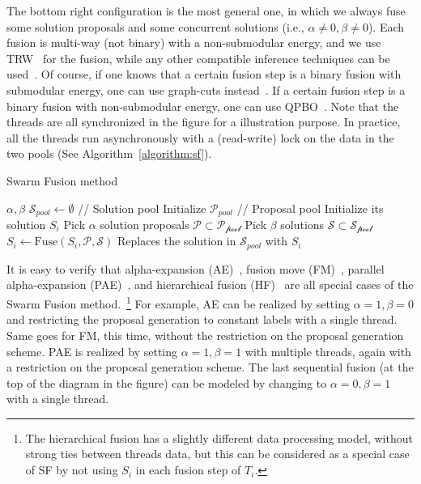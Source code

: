 %
The bottom right configuration is the most general one, in which we
always fuse some solution proposals and some concurrent solutions
(i.e., $\alpha\ne 0, \beta \ne 0$).
%
Each fusion is multi-way (not binary) with a non-submodular energy, and
we use TRW~\cite{kolmogorov} for the fusion, while any other compatible
inference techniques can be used~\cite{opengm}. Of course, if one knows
that a certain fusion step is a binary fusion with submodular energy,
one can use graph-cuts instead~\cite{alpha_expansion_paper}. If a
certain fusion step is a binary fusion with non-submodular energy, one
can use QPBO~\cite{second_order_smoothness_stereo}.
%
Note that the threads are all synchronized in the figure for a
illustration purpose. In practice, all the threads run asynchronously
with a (read-write) lock on the data in the two pools (See Algorithm~\ref{algorithm:sf}).
%
%
%
\begin{algorithm}
 \caption{Swarm Fusion method}
 \label{algorithm:sf}
 \begin{algorithmic}
  \Procedure{} {$\alpha, \beta$}
  \State $\mathcal{S}_{pool} \leftarrow \emptyset$ //
  Solution pool
  \State Initialize $\mathcal{P}_{pool}$ // Proposal pool
  \State Initialize its solution $S_i$
  \EndFor
  \State
  \State Pick $\alpha$ solution proposals $\mathcal{P}\subset \mathcal{P_{\mbox{pool}}}$
  \State Pick $\beta$ solutions $\mathcal{S} \subset \mathcal{S_{\mbox{pool}}}$
  \State $S_i \leftarrow \mbox{Fuse}(S_i, \mathcal{P}, \mathcal{S})$
  \State Replaces the solution in $\mathcal{S}_{pool}$ with $S_i$
  \EndFor
  \EndProcedure
 \end{algorithmic}
\end{algorithm}



\noindent It is easy to verify that alpha-expansion
(AE)~\cite{alpha_expansion}, fusion move (FM)~\cite{viktor}, parallel
alpha-expansion (PAE)~\cite{delong}, and hierarchical fusion
(HF)~\cite{delong_hierarchical,olga} are all special cases of the Swarm
Fusion method.~\footnote{The hierarchical fusion has a slightly
different data processing model, without strong ties between threads
data, but this can be considered as a special case of SF by not using
$S_i$ in each fusion step of $T_i$.} For example, AE can be realized by
setting $\alpha=1, \beta=0$ and restricting the proposal generation to
constant labels with a single thread. Same goes for FM, this time,
without the restriction on the proposal generation scheme. PAE is
realized by setting $\alpha=1,\beta=1$ with multiple threads, again with
a restriction on the proposal generation scheme. The last sequential
fusion (at the top of the diagram in the figure) can be modeled by
changing to $\alpha=0, \beta=1$ with a single thread.


